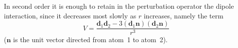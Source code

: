 In second order it is enough to retain in the perturbation operator the dipole interaction, since it decreases most slowly as $r$ increases, namely the term
\begin{equation}
V=\frac{\mathbf d_1\mathbf d_2-3(\mathbf d_1\mathbf n)(\mathbf d_2\mathbf n)}{r^3}
\tag{89.1}
\end{equation}
($\mathbf n$ is the unit vector directed from atom~1 to atom~2).
